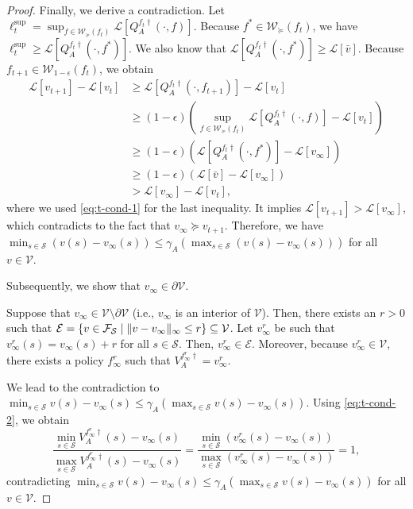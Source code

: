 \documentclass{acml}
\DeclarePairedDelimiter{\norm}{\lVert}{\rVert}
\begin{document}
\begin{proof}
	Finally, we derive a contradiction.
	Let $\ell_{t}^{\sup} = \sup_{f \in \mathcal{W}_\succcurlyeq(f_t)} \mathcal{L}[Q_A^{f_t\dag}(\cdot, f)]$. 
	Because $f^* \in \mathcal{W}_\succcurlyeq(f_t)$, we have $\ell_{t}^{\sup} \ge \mathcal{L}[Q_A^{f_t\dag}(\cdot, f^*)]$.
	We also know that $\mathcal{L}[Q_A^{f_t\dag}(\cdot, f^*)] \ge \mathcal{L}[\bar{v}]$. 
	Because $f_{t+1} \in \mathcal{W}_{1-\epsilon}(f_t)$, we obtain
	\begin{subequations}
		\begin{align}
			\mathcal{L}[v_{t+1}] - \mathcal{L}[v_{t}]
			&\ge \mathcal{L}[Q_A^{f_t\dag}(\cdot, f_{t+1})] - \mathcal{L}[v_{t}] \\
			&\ge (1 - \epsilon) \left(\sup_{f \in \mathcal{W}_\succcurlyeq(f_t)} \mathcal{L}[Q_A^{f_t\dag}(\cdot, f)] - \mathcal{L}[v_{t}]\right) \\
			&\ge (1 - \epsilon) ( \mathcal{L}[Q_A^{f_t\dag}(\cdot, f^*)] - \mathcal{L}[v_\infty]) \\            
			&\ge (1 - \epsilon) (\mathcal{L}[\bar{v}] - \mathcal{L}[v_\infty]) \\            
			&> \mathcal{L}[v_\infty] - \mathcal{L}[v_t] ,
		\end{align}
	\end{subequations}
	where we used \cref{eq:t-cond-1} for the last inequality.
	It implies $\mathcal{L}[v_{t+1}] > \mathcal{L}[v_\infty]$, which contradicts to the fact that $v_\infty \succcurlyeq v_{t+1}$.
	Therefore, we have $\min_{s \in \mathcal{S}} (v(s) - v_\infty(s))  \le \gamma_A\left( \max_{s \in \mathcal{S}} (v(s) - v_\infty(s)) \right)$ for all $v\in \mathcal{V}$. 
	
	Subsequently, we show that $v_\infty \in \partial \mathcal{V}$. 
	
	Suppose that $v_\infty \in \mathcal{V}\setminus \partial\mathcal{V}$ (i.e., $v_\infty$ is an interior of $\mathcal{V}$). 
	Then, there exists an $r > 0$ such that $\mathcal{E} = \{v \in \mathcal{F}_\mathcal{S} \mid \norm{v - v_\infty}_{\infty} \le r\} \subseteq \mathcal{V}$.
	Let $v_{\infty}^r$ be such that $v_{\infty}^r(s) = v_{\infty}(s) + r$ for all $s\in\mathcal{S}$. 
	Then, $v_{\infty}^r \in \mathcal{E}$. 
	Moreover, because $v_{\infty}^r \in \mathcal{V}$, there exists a policy $f_\infty^r$ such that $V_A^{f_\infty^r \dag} = v_{\infty}^r$.
	
	We lead to the contradiction to $\min_{s \in \mathcal{S}} v(s) - v_\infty(s)  \le \gamma_A\left( \max_{s \in \mathcal{S}} v(s) - v_\infty(s) \right)$.
	Using \cref{eq:t-cond-2}, we obtain
	\begin{equation}
		\frac{\min_{s \in \mathcal{S}} V_A^{f_\infty^r \dag}(s) - v_\infty(s)}{\max_{s \in \mathcal{S}} V_A^{f_\infty^r \dag}(s) - v_\infty(s)} 
		= 
		\frac{\min_{s \in \mathcal{S}} (v_\infty^r(s) - v_\infty(s)) }{\max_{s \in \mathcal{S}} (v_\infty^r(s) - v_\infty(s))} 
		= 1,
	\end{equation}
	contradicting $\min_{s \in \mathcal{S}} v(s) - v_\infty(s)  \le \gamma_A\left( \max_{s \in \mathcal{S}} v(s) - v_\infty(s) \right)$ for all $v \in \mathcal{V}$. 
	

\end{proof}
\end{document}
